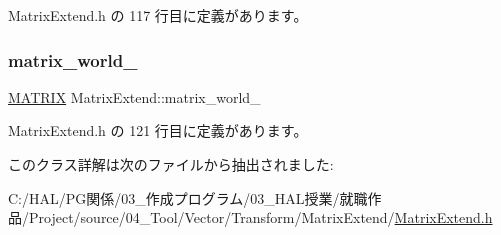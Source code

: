  Matrix\+Extend.\+h の 117 行目に定義があります。

\mbox{\label{class_matrix_extend_ae464d60827194857bc39c2f0cffd768b}} 
\subsubsection{\texorpdfstring{matrix\+\_\+world\+\_\+}{matrix\_world\_}}
{\footnotesize\ttfamily \mbox{\hyperlink{_vector3_d_8h_a032295cd9fb1b711757c90667278e744}{M\+A\+T\+R\+IX}} Matrix\+Extend\+::matrix\+\_\+world\+\_\+\hspace{0.3cm}{\ttfamily [private]}}



 Matrix\+Extend.\+h の 121 行目に定義があります。



このクラス詳解は次のファイルから抽出されました\+:\begin{DoxyCompactItemize}
\item 
C\+:/\+H\+A\+L/\+P\+G関係/03\+\_\+作成プログラム/03\+\_\+\+H\+A\+L授業/就職作品/\+Project/source/04\+\_\+\+Tool/\+Vector/\+Transform/\+Matrix\+Extend/\mbox{\hyperlink{_matrix_extend_8h}{Matrix\+Extend.\+h}}\end{DoxyCompactItemize}
